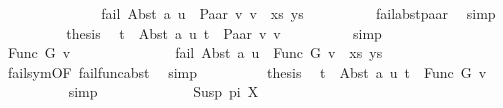 \begin{isabellebody}
\ \ \ \ \ \ %
\isanewline
\ \ \ \ \ \ \isamarkupfalse%
\ {\isachardoublequoteopen}fail\ {\isacharparenleft}{\kern0pt}{\isacharparenleft}{\kern0pt}Abst\ a\ u\ {\isasymapprox}{\isacharquery}{\kern0pt}\ Paar\ v{}\ v{}{\isacharparenright}{\kern0pt}\ {\isacharhash}{\kern0pt}\ xs{\isacharcomma}{\kern0pt}\ ys{\isacharparenright}{\kern0pt}{\isachardoublequoteclose}\isanewline
\ \ \ \ \ \ \ \ \isamarkupfalse%
\ fail{\isacharunderscore}{\kern0pt}abst{\isacharunderscore}{\kern0pt}paar\ \isamarkupfalse%
\ simp\isanewline
\ \ \ \ \ \ \isamarkupfalse%
\ \isamarkupfalse%
\ {\isacharquery}{\kern0pt}thesis\ \isamarkupfalse%
\ {\isacartoucheopen}t{}\ {\isacharequal}{\kern0pt}\ Abst\ a\ u{\isacartoucheclose}\ {\isacartoucheopen}t{}\ {\isacharequal}{\kern0pt}\ Paar\ v{}\ v{}{\isacartoucheclose}\isanewline
\ \ \ \ \ \ \ \ \isamarkupfalse%
\ simp\isanewline
\ \ \ \ \isamarkupfalse%
\isanewline
\ \ \ \ \ \ \isamarkupfalse%
\ {\isacharparenleft}{\kern0pt}Func\ G\ v{\isacharparenright}{\kern0pt}\isanewline
\ \ \ \ \ \ %
\isanewline
\ \ \ \ \ \ \isamarkupfalse%
\ {\isachardoublequoteopen}fail\ {\isacharparenleft}{\kern0pt}{\isacharparenleft}{\kern0pt}Abst\ a\ u\ {\isasymapprox}{\isacharquery}{\kern0pt}\ Func\ G\ v{\isacharparenright}{\kern0pt}\ {\isacharhash}{\kern0pt}\ xs{\isacharcomma}{\kern0pt}\ ys{\isacharparenright}{\kern0pt}{\isachardoublequoteclose}\isanewline
\ \ \ \ \ \ \ \ \isamarkupfalse%
\ fail{\isacharunderscore}{\kern0pt}sym{\isacharbrackleft}{\kern0pt}OF\ fail{\isacharunderscore}{\kern0pt}func{\isacharunderscore}{\kern0pt}abst{\isacharbrackright}{\kern0pt}\ \isamarkupfalse%
\ simp\isanewline
\ \ \ \ \ \ \isamarkupfalse%
\ \isamarkupfalse%
\ {\isacharquery}{\kern0pt}thesis\ \isamarkupfalse%
\ {\isacartoucheopen}t{}\ {\isacharequal}{\kern0pt}\ Abst\ a\ u{\isacartoucheclose}\ {\isacartoucheopen}t{}\ {\isacharequal}{\kern0pt}\ Func\ G\ v{\isacartoucheclose}\isanewline
\ \ \ \ \ \ \ \ \isamarkupfalse%
\ simp\isanewline
\ \ \ \ \isamarkupfalse%
\isanewline
\ \ \isamarkupfalse%
\isanewline
\ \ \ \ \isamarkupfalse%
\ {\isacharparenleft}{\kern0pt}Susp\ pi\ X{\isacharparenright}{\kern0pt}\isanewline

\end{isabellebody}
